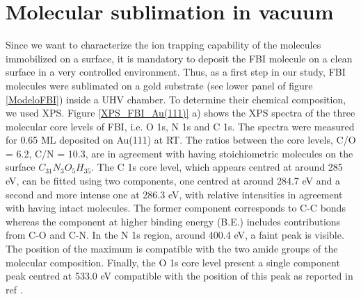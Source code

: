\documentclass[aps,prl,reprint,longbibliography,superscriptaddress, english]{revtex4-1}
\begin{document}

\section{Molecular sublimation in vacuum}
Since we want to characterize the ion trapping capability of the molecules immobilized on a surface, it is mandatory to deposit the FBI molecule on a clean surface in a very controlled environment. Thus, as a first step in our study, FBI molecules were sublimated on a gold substrate (see lower panel of figure \ref{ModeloFBI}) inside a UHV chamber. To determine their chemical composition, we used XPS. Figure \ref{XPS_FBI_Au(111)} a) shows the XPS spectra of the three molecular core levels of FBI, i.e. O 1s, N 1s and C 1s. The spectra were measured for 0.65 ML deposited on Au(111) at RT. The ratios between the core levels, C/O = 6.2, C/N = 10.3, are in agreement with having stoichiometric molecules on the surface $ C_{31}N_{3}O_{5}H_{35}$. The C 1s core level, which appears centred at around 285 eV, can be fitted using two components, one centred at around 284.7 eV and a second and more intense one at 286.3 eV, with relative intensities in agreement with having intact molecules. The former component corresponds to C-C bonds whereas the component at higher binding energy (B.E.) includes contributions from C-O and C-N. In the N 1s region, around 400.4 eV, a faint peak is visible. The position of the maximum is compatible with the two amide groups of the molecular composition. Finally, the O 1s core level present a single component peak centred at 533.0 eV compatible with the position of this peak as reported in ref \cite{stredansky_-surface_2019}. 
\end{document}
